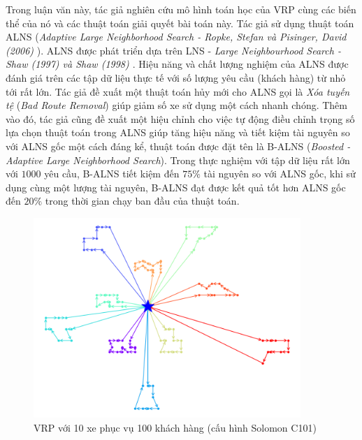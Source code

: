 Trong luận văn này, tác giả nghiên cứu mô hình toán học của VRP cùng các biến thể của nó và các thuật toán giải quyết bài toán này. Tác giả sử dụng thuật toán ALNS (\textit{Adaptive Large Neighborhood Search - Ropke, Stefan và Pisinger, David (2006)} \cite{ropke2006adaptive}). ALNS được phát triển dựa trên LNS - \textit{Large Neighbourhood Search - Shaw (1997) \cite{shaw1997new} và Shaw (1998) \cite{shaw1998using}}. Hiệu năng và chất lượng nghiệm của ALNS được đánh giá trên các tập dữ liệu thực tế với số lượng yêu cầu (khách hàng) từ nhỏ tới rất lớn. Tác giả đề xuất một thuật toán hủy mới cho ALNS gọi là \textit{Xóa tuyến tệ} (\textit{Bad Route Removal}) giúp giảm số xe sử dụng một cách nhanh chóng. Thêm vào đó, tác giả cũng đề xuất một hiệu chỉnh cho việc tự động điều chỉnh trọng số lựa chọn thuật toán trong ALNS giúp tăng hiệu năng và tiết kiệm tài nguyên so với ALNS gốc một cách đáng kể, thuật toán được đặt tên là B-ALNS (\textit{Boosted - Adaptive Large Neighborhood Search}). Trong thực nghiệm với tập dữ liệu rất lớn với $1000$ yêu cầu, B-ALNS tiết kiệm đến $75\%$ tài nguyên so với ALNS gốc, khi sử dụng cùng một lượng tài nguyên, B-ALNS đạt được kết quả tốt hơn ALNS gốc đến $20\%$ trong thời gian chạy ban đầu của thuật toán.

\begin{figure}[H] %
  \centering %
  \includegraphics[width=0.9\textwidth]{figures/routes_c101.png} 
  \caption{VRP với 10 xe phục vụ 100 khách hàng (cấu hình Solomon C101)} 
\end{figure}

